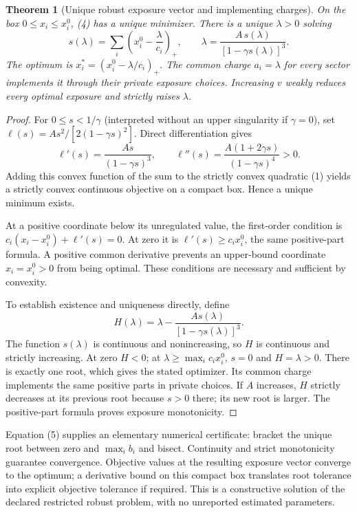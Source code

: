 \documentclass[11pt,a4paper]{article}
\newtheorem{theorem}{Theorem}[section]
\theoremstyle{remark}
\begin{document}
\begin{theorem}[Unique robust exposure vector and implementing charges]
On the box $0\le x_i\le x_i^0$, (4) has a unique minimizer. There is a unique $\lambda>0$ solving
\[
 s(\lambda)=\sum_i\left(x_i^0-\frac\lambda{c_i}\right)_+,
 \qquad
 \lambda=\frac{A\,s(\lambda)}{[1-\gamma s(\lambda)]^3}. \tag{5}
\]
The optimum is $x_i^*=(x_i^0-\lambda/c_i)_+$. The common charge $a_i=\lambda$ for every sector implements it through their private exposure choices. Increasing $v$ weakly reduces every optimal exposure and strictly raises $\lambda$.
\end{theorem}
\begin{proof}
For $0\le s<1/\gamma$ (interpreted without an upper singularity if $\gamma=0$), set $\ell(s)=A s^2/[2(1-\gamma s)^2]$. Direct differentiation gives
\[
 \ell'(s)=\frac{As}{(1-\gamma s)^3},\qquad
 \ell''(s)=\frac{A(1+2\gamma s)}{(1-\gamma s)^4}>0.
\]
Adding this convex function of the sum to the strictly convex quadratic (1) yields a strictly convex continuous objective on a compact box. Hence a unique minimum exists.

At a positive coordinate below its unregulated value, the first-order condition is $c_i(x_i-x_i^0)+\ell'(s)=0$. At zero it is $\ell'(s)\ge c_ix_i^0$, the same positive-part formula. A positive common derivative prevents an upper-bound coordinate $x_i=x_i^0>0$ from being optimal. These conditions are necessary and sufficient by convexity.

To establish existence and uniqueness directly, define
\[
 H(\lambda)=\lambda-\frac{As(\lambda)}{[1-\gamma s(\lambda)]^3}.
\]
The function $s(\lambda)$ is continuous and nonincreasing, so $H$ is continuous and strictly increasing. At zero $H<0$; at $\lambda\ge\max_i c_i x_i^0$, $s=0$ and $H=\lambda>0$. There is exactly one root, which gives the stated optimizer. Its common charge implements the same positive parts in private choices. If $A$ increases, $H$ strictly decreases at its previous root because $s>0$ there; its new root is larger. The positive-part formula proves exposure monotonicity.
\end{proof}

Equation (5) supplies an elementary numerical certificate: bracket the unique root between zero and $\max_i b_i$ and bisect. Continuity and strict monotonicity guarantee convergence. Objective values at the resulting exposure vector converge to the optimum; a derivative bound on this compact box translates root tolerance into explicit objective tolerance if required. This is a constructive solution of the declared restricted robust problem, with no unreported estimated parameters.
\end{document}
